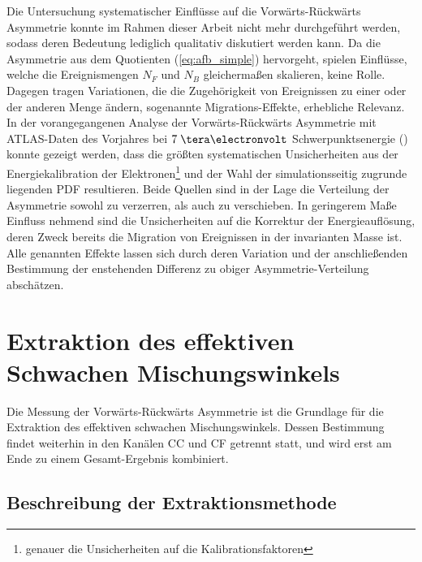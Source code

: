 Die Untersuchung systematischer Einflüsse auf die Vorwärts-Rückwärts
Asymmetrie konnte im Rahmen dieser Arbeit nicht mehr durchgeführt werden, sodass deren
Bedeutung lediglich qualitativ diskutiert werden kann. Da die Asymmetrie aus
dem Quotienten (\ref{eq:afb_simple}) hervorgeht, spielen Einflüsse, welche die
Ereignismengen $N_F$ und $N_B$ gleichermaßen skalieren, keine Rolle. Dagegen 
tragen Variationen, die die Zugehörigkeit von Ereignissen zu einer oder der
anderen Menge ändern, sogenannte Migrations-Effekte, erhebliche Relevanz. In der
vorangegangenen Analyse der Vorwärts-Rückwärts Asymmetrie mit \acs{ATLAS}-Daten
des Vorjahres bei $7\TeV$ Schwerpunktsenergie (\cite{ATLAS-CONF-2013-043})
konnte gezeigt werden, dass die größten systematischen Unsicherheiten aus der
Energiekalibration der Elektronen\footnote{genauer die Unsicherheiten auf die
Kalibrationsfaktoren} und der Wahl der simulationsseitig zugrunde liegenden
\acl{PDF} resultieren. Beide Quellen sind in der Lage die Verteilung der
Asymmetrie sowohl zu verzerren, als auch zu verschieben. In geringerem
Maße Einfluss nehmend sind die Unsicherheiten auf die Korrektur der
Energieauflösung, deren Zweck bereits die Migration von Ereignissen in der
invarianten Masse ist. Alle genannten Effekte lassen sich durch deren Variation
und der anschließenden Bestimmung der enstehenden Differenz zu obiger
Asymmetrie-Verteilung abschätzen.



\section{Extraktion des effektiven Schwachen Mischungswinkels}
\label{afb:sin2theta}

Die Messung der Vorwärts-Rückwärts Asymmetrie ist die Grundlage für die
Extraktion des effektiven schwachen Mischungswinkels. Dessen Bestimmung findet
weiterhin in den Kanälen \ac{CC} und \ac{CF} getrennt statt, und wird erst am
Ende zu einem Gesamt-Ergebnis kombiniert. 



\subsection{Beschreibung der Extraktionsmethode}
\label{afb:extraction_method}


